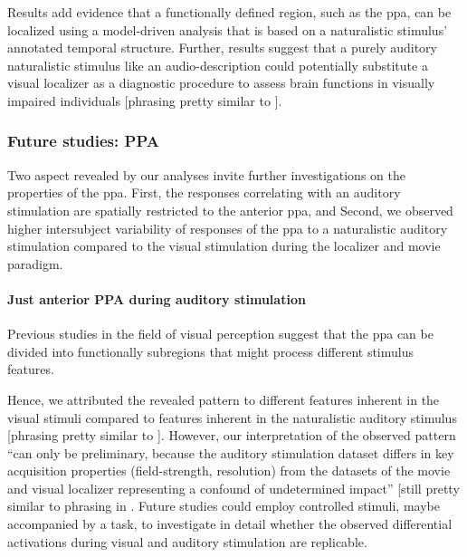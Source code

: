 
Results add evidence \citep[cf.][]{bartels2004mapping} that a functionally
defined region, such as the \ac{ppa}, can be localized using a model-driven
analysis that is based on a naturalistic stimulus' annotated temporal structure.
Further, results suggest that a purely auditory naturalistic stimulus like an
audio-description could potentially substitute a visual localizer as a
diagnostic procedure to assess brain functions in visually impaired individuals
[phrasing pretty similar to \citep{haeusler2022processing}].


\subsubsection{Future studies: PPA}

%
Two aspect revealed by our analyses invite further investigations on the
properties of the \ac{ppa}.
%
First, the responses correlating with an auditory stimulation are spatially
restricted to the anterior \ac{ppa}, and
%
Second, we observed higher intersubject variability of responses of the \ac{ppa}
to a naturalistic auditory stimulation compared to the visual stimulation during
the localizer and movie paradigm.


\paragraph{Just anterior PPA during auditory stimulation}

Previous studies in the field of visual perception suggest that the \ac{ppa} can
be divided into functionally subregions that might process different stimulus
features.


%
Hence, we attributed the revealed pattern to different features inherent in the
visual stimuli compared to features inherent in the naturalistic auditory
stimulus [phrasing pretty similar to \citep{haeusler2022processing}].
%
However, our interpretation of the observed pattern ``can only be preliminary,
because the auditory stimulation dataset differs in key acquisition properties
(field-strength, resolution) from the datasets of the movie and visual localizer
representing a confound of undetermined impact'' [still pretty similar to
phrasing in \citep{haeusler2022processing}.
Future studies could employ controlled stimuli, maybe accompanied by a task, to
investigate in detail whether the observed differential activations during
visual and auditory stimulation are replicable.


